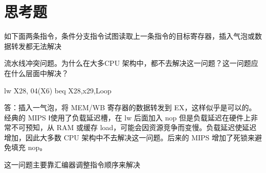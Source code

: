 \documentclass{../source/Experiment}
\begin{document}
    \section{思考题}
    如下面两条指令，条件分支指令试图读取上一条指令的目标寄存器，插入气泡或数据转发都无法解决

    流水线冲突问题。为什么在大多CPU 架构中，都不去解决这一问题？这一问题应在什么层面中解决？
        
    lw X28, 04(X6)
    beq X28,x29,Loop

    答：插入一气泡，将 MEM/WB 寄存器的数据转发到 EX，这样似乎是可以的。经典的 MIPS Ⅰ使用了负载延迟槽，在 lw 后面加入 nop 但是负载延迟在硬件上非常不可预知，从 RAM 或缓存 load，可能会因资源竞争而变慢。负载延迟使延迟增加，因此大多数 CPU 架构中不去解决这一问题。后来的 MIPS 增加了死锁来避免填充 nop。

    这一问题主要靠汇编器调整指令顺序来解决
\end{document}
